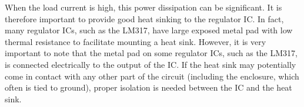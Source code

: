 \documentclass[letterpaper, 11pt]{article}
\begin{document}
When the load current is high, this power dissipation can be significant. It is therefore important to provide good heat sinking to the regulator IC. In fact, many regulator ICs, such as the LM317,  have large exposed metal pad with low thermal resistance to facilitate mounting a heat sink.  However, it is very important to note that the metal pad on some regulator ICs, such as the LM317, is connected electrically to the output of the IC. If the heat sink may potentially come in contact with any other part of the circuit (including the enclosure, which often is tied to ground), proper isolation is needed between the IC and the heat sink. 
%
\end{document}

